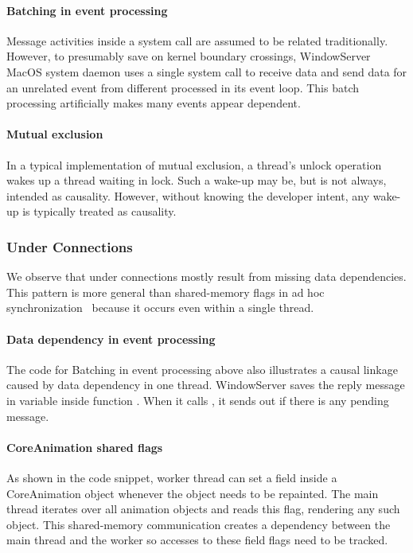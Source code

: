 \paragraph{Batching in event processing}

Message activities inside a system call are assumed to be related traditionally.
However, to presumably save on kernel boundary crossings, WindowServer MacOS
system daemon uses a single system call to receive data and send data for an
unrelated event from different processed in its event loop. This batch processing
artificially makes many events appear dependent.

\paragraph{Mutual exclusion}

In a typical implementation of mutual exclusion, a thread's unlock operation
wakes up a thread waiting in lock. Such a wake-up may be, but is not always,
intended as causality. However, without knowing the developer intent, any
wake-up is typically treated as causality. %

\subsubsection{Under Connections}\label{subsec:underconnections}

We observe that under connections mostly result from missing data
dependencies.  This pattern is more general than shared-memory flags in ad
hoc synchronization~\cite{xiong2010ad} because it occurs even within a
single thread.

\paragraph{Data dependency in event processing}
The code for Batching in event processing above also illustrates a causal
linkage caused by data dependency in one thread. WindowServer saves the
reply message in variable  inside function
.  When it calls , it
sends out  if there is any pending message.

\paragraph{CoreAnimation shared flags}
As shown in the code snippet, worker thread can set
a field  inside a CoreAnimation
object whenever the object needs to be repainted. The main thread iterates over
all animation objects and reads this flag, rendering any such object. This
shared-memory communication creates a dependency between the main thread and the
worker so accesses to these field flags need to be tracked.

